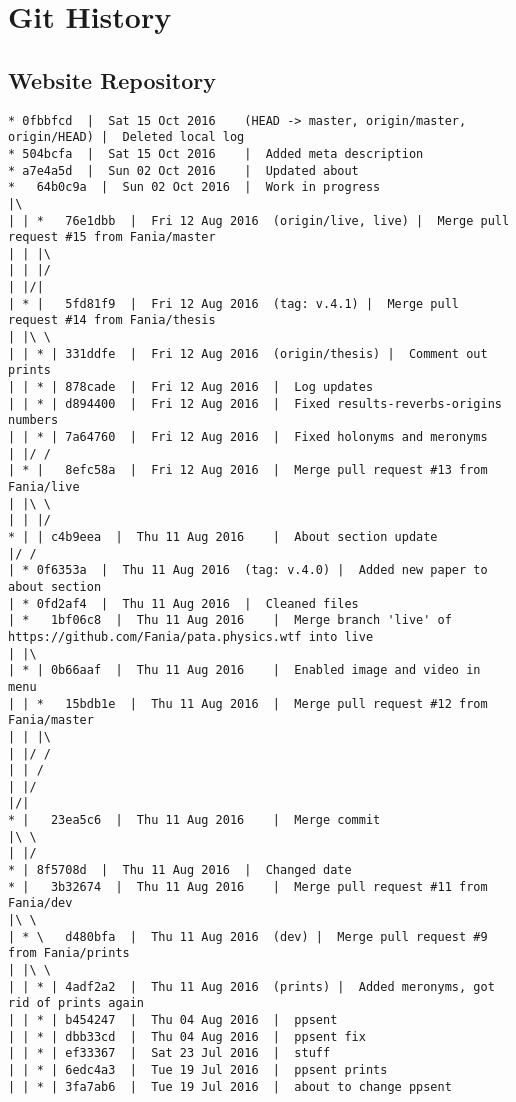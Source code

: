 
\chapter{Git History}
\label{app:git}


\section{Website Repository}

\begin{verbatim}
* 0fbbfcd  |  Sat 15 Oct 2016	 (HEAD -> master, origin/master, origin/HEAD) |  Deleted local log
* 504bcfa  |  Sat 15 Oct 2016	 |  Added meta description
* a7e4a5d  |  Sun 02 Oct 2016	 |  Updated about
*   64b0c9a  |  Sun 02 Oct 2016	 |  Work in progress
|\  
| | *   76e1dbb  |  Fri 12 Aug 2016	 (origin/live, live) |  Merge pull request #15 from Fania/master
| | |\  
| | |/  
| |/|   
| * |   5fd81f9  |  Fri 12 Aug 2016	 (tag: v.4.1) |  Merge pull request #14 from Fania/thesis
| |\ \  
| | * | 331ddfe  |  Fri 12 Aug 2016	 (origin/thesis) |  Comment out prints
| | * | 878cade  |  Fri 12 Aug 2016	 |  Log updates
| | * | d894400  |  Fri 12 Aug 2016	 |  Fixed results-reverbs-origins numbers
| | * | 7a64760  |  Fri 12 Aug 2016	 |  Fixed holonyms and meronyms
| |/ /  
| * |   8efc58a  |  Fri 12 Aug 2016	 |  Merge pull request #13 from Fania/live
| |\ \  
| | |/  
* | | c4b9eea  |  Thu 11 Aug 2016	 |  About section update
|/ /  
| * 0f6353a  |  Thu 11 Aug 2016	 (tag: v.4.0) |  Added new paper to about section
| * 0fd2af4  |  Thu 11 Aug 2016	 |  Cleaned files
| *   1bf06c8  |  Thu 11 Aug 2016	 |  Merge branch 'live' of https://github.com/Fania/pata.physics.wtf into live
| |\  
| * | 0b66aaf  |  Thu 11 Aug 2016	 |  Enabled image and video in menu
| | *   15bdb1e  |  Thu 11 Aug 2016	 |  Merge pull request #12 from Fania/master
| | |\  
| |/ /  
| | /   
| |/    
|/|     
* |   23ea5c6  |  Thu 11 Aug 2016	 |  Merge commit
|\ \  
| |/  
* | 8f5708d  |  Thu 11 Aug 2016	 |  Changed date
* |   3b32674  |  Thu 11 Aug 2016	 |  Merge pull request #11 from Fania/dev
|\ \  
| * \   d480bfa  |  Thu 11 Aug 2016	 (dev) |  Merge pull request #9 from Fania/prints
| |\ \  
| | * | 4adf2a2  |  Thu 11 Aug 2016	 (prints) |  Added meronyms, got rid of prints again
| | * | b454247  |  Thu 04 Aug 2016	 |  ppsent
| | * | dbb33cd  |  Thu 04 Aug 2016	 |  ppsent fix
| | * | ef33367  |  Sat 23 Jul 2016	 |  stuff
| | * | 6edc4a3  |  Tue 19 Jul 2016	 |  ppsent prints
| | * | 3fa7ab6  |  Tue 19 Jul 2016	 |  about to change ppsent

\end{verbatim}
